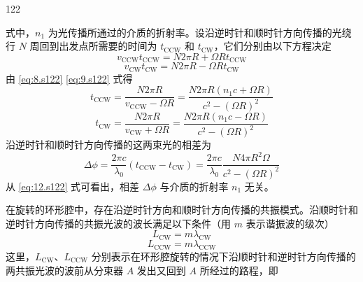 \begin{solution}{122}
\begin{subsolution}
\begin{equation}
            \label{eq:7.s122}
        \end{equation}
        式中，$n_{1}$ 为光传播所通过的介质的折射率。设沿逆时针和顺时针方向传播的光绕行 $N$ 周回到出发点所需要的时间为 $t_{\mathrm{CCW}}$ 和 $t_{\mathrm{CW}}$，它们分别由以下方程决定
        \begin{equation}
            v_{\mathrm{CCW}} t_{\mathrm{CCW}} = N 2 \pi R + \Omega R t_{\mathrm{CCW}}
            \label{eq:8.s122}
        \end{equation}
        \begin{equation}
            v_{\mathrm{CW}} t_{\mathrm{CW}} = N 2 \pi R - \Omega R t_{\mathrm{CW}}
            \label{eq:9.s122}
        \end{equation}
        由 \eqref{eq:8.s122} \eqref{eq:9.s122} 式得
        \begin{equation}
            t_{\mathrm{CCW}} = \frac{N 2 \pi R}{v_{\mathrm{CCW}} - \Omega R} = \frac{N 2 \pi R (n_{1} c + \Omega R)}{c^{2} - (\Omega R)^{2}}
            \label{eq:10.s122}
        \end{equation}
        \begin{equation}
            t_{\mathrm{CW}} = \frac{N 2 \pi R}{v_{\mathrm{CW}} + \Omega R} = \frac{N 2 \pi R (n_{1} c - \Omega R)}{c^{2} - (\Omega R)^{2}}
            \label{eq:11.s122}
        \end{equation}
        沿逆时针和顺时针方向传播的这两束光的相差为
        \begin{equation}
            \Delta \phi = \frac{2 \pi c}{\lambda_{0}} (t_{\mathrm{CCW}} - t_{\mathrm{CW}}) = \frac{2 \pi c}{\lambda_{0}} \frac{N 4 \pi R^{2} \Omega}{c^{2} - (\Omega R)^{2}}
            \label{eq:12.s122}
        \end{equation}
        从 \eqref{eq:12.s122} 式可看出，相差 $\Delta \phi$ 与介质的折射率 $n_{1}$ 无关。
    \end{subsolution}
    \begin{subsolution}
        在旋转的环形腔中，存在沿逆时针方向和顺时针方向传播的共振模式。沿顺时针和逆时针方向传播的共振光波的波长满足以下条件（用 $m$ 表示谐振波的级次）
        \begin{equation}
            L_{\mathrm{CW}} = m \lambda_{\mathrm{CW}}
            \label{eq:13.s122}
        \end{equation}
        \begin{equation}
            L_{\mathrm{CCW}} = m \lambda_{\mathrm{CCW}}
            \label{eq:14.s122}
        \end{equation}
        这里，$L_{\mathrm{CW}}$、$L_{\mathrm{CCW}}$ 分别表示在环形腔旋转的情况下沿顺时针和逆时针方向传播的两共振光波的波前从分束器 $A$ 发出又回到 $A$ 所经过的路程，即

\end{subsolution}
\end{solution}
